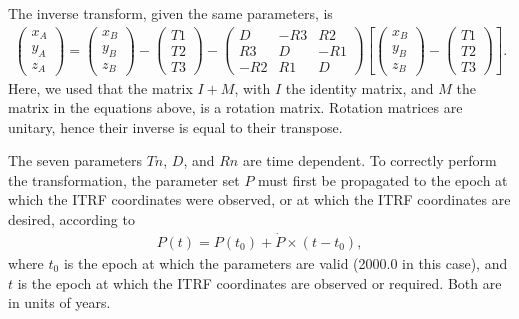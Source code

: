 \documentclass[a4paper,10pt,english]{sphinxmanual}
\begin{document}
The inverse transform, given the same parameters, is
\begin{equation*}
\begin{split}\left(\begin{array}{c} x_A \\ y_A \\ z_A\end{array}\right) = 
\left(\begin{array}{c} x_B \\ y_B \\ z_B\end{array}\right) -
\left(\begin{array}{c} T1 \\ T2 \\ T3\end{array}\right) -
\left(\begin{array}{ccc}
    D  & -R3 &  R2 \\
    R3 &  D  & -R1 \\ 
   -R2 &  R1 &  D
\end{array}\right)
\left[\left(\begin{array}{c} x_B \\ y_B \\ z_B\end{array}\right) - 
      \left(\begin{array}{c} T1 \\ T2 \\ T3\end{array}\right)\right].\end{split}
\end{equation*}
Here, we used that the matrix \(I + M\), with \(I\) the identity matrix,
and \(M\) the matrix in the equations above, is a rotation
matrix. Rotation matrices are unitary, hence their inverse is equal to
their transpose.

The seven parameters \(Tn\), \(D\), and \(Rn\) are time
dependent. To correctly perform the transformation, the parameter set
\(P\) must first be propagated to the epoch at which the ITRF
coordinates were observed, or at which the ITRF coordinates are
desired, according to
\begin{equation*}
\begin{split}P(t) = P(t_0) + \dot{P}\times(t - t_0),\end{split}
\end{equation*}
where \(t_0\) is the epoch at which the parameters are valid
(2000.0 in this case), and \(t\) is the epoch at which the ITRF
coordinates are observed or required. Both are in units of years.
\end{document}
